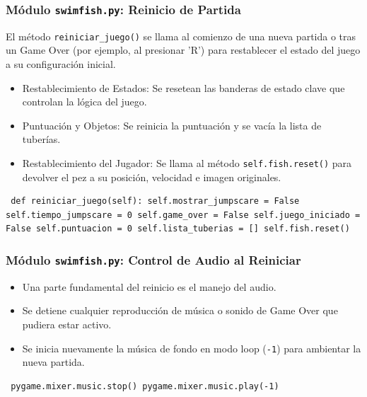 \documentclass[
	11pt, %
]{beamer}
\begin{document}
\begin{frame}[fragile] \frametitle{Módulo \texttt{swimfish.py}: Reinicio de Partida}

El método \texttt{reiniciar_juego()} se llama al comienzo de una nueva partida o tras un Game Over (por ejemplo, al presionar 'R') para restablecer el estado del juego a su configuración inicial.

\begin{itemize} \item Restablecimiento de Estados: Se resetean las banderas de estado clave que controlan la lógica del juego. \item Puntuación y Objetos: Se reinicia la puntuación y se vacía la lista de tuberías. \item Restablecimiento del Jugador: Se llama al método \texttt{self.fish.reset()} para devolver el pez a su posición, velocidad e imagen originales. \end{itemize}

\vspace{4pt} {\scriptsize \begin{verbatim} def reiniciar_juego(self): self.mostrar_jumpscare = False self.tiempo_jumpscare = 0 self.game_over = False self.juego_iniciado = False self.puntuacion = 0 self.lista_tuberias = [] self.fish.reset() \end{verbatim} } \end{frame}


\begin{frame}[fragile] \frametitle{Módulo \texttt{swimfish.py}: Control de Audio al Reiniciar}

\begin{itemize} \item Una parte fundamental del reinicio es el manejo del audio. \item Se detiene cualquier reproducción de música o sonido de Game Over que pudiera estar activo. \item Se inicia nuevamente la música de fondo en modo loop (\texttt{-1}) para ambientar la nueva partida. \end{itemize}

\vspace{4pt} {\scriptsize \begin{verbatim} pygame.mixer.music.stop() pygame.mixer.music.play(-1) \end{verbatim} } \end{frame}
\end{document}
